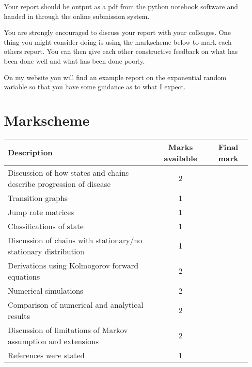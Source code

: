 \documentclass[paper=a4, fontsize=11pt]{scrartcl}
\numberwithin{equation}{section}
\numberwithin{figure}{section}
\numberwithin{table}{section}
\begin{document}
Your report should be output as a pdf from the python notebook software and handed in through the online submission system.

You are strongly encouraged to discuss your report with your colleages.  One thing you might consider doing is using the markscheme below to mark each others report.  You can then give each other 
constructive feedback on what has been done well and what has been done poorly.

On my website you will find an example report on the exponential random variable so that you have some guidance as to what I expect.

\section{Markscheme}

\begin{center}
\begin{tabular}{ l | c | c }
Description & Marks available & Final mark \\ \hline
Discussion of how states and chains describe progression of disease & 2 & \\
Transition graphs & 1 & \\
Jump rate matrices & 1 & \\
Classifications of state & 1 & \\
Discussion of chains with stationary/no stationary distribution & 1 & \\
Derivations using Kolmogorov forward equations & 2 & \\
Numerical simulations & 2 & \\
Comparison of numerical and analytical results & 2 & \\
Discussion of limitations of Markov assumption and extensions & 2 & \\
References were stated & 1 
\end{tabular}
\end{center}
\end{document}
